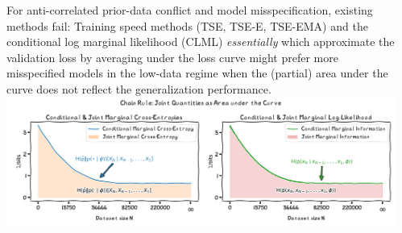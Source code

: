 \documentclass[25pt,a0paper,landscape]{tikzposter}
\begin{document}
\begin{columns}
{{\begin{theorybox}
        For anti-correlated prior-data conflict and model misspecification, existing methods fail:
        Training speed methods (TSE, TSE-E, TSE-EMA) \citep{lyle2020bayesian,ru2021speedy} and the conditional log marginal likelihood (CLML) \citep{fong2020marginal,lotfi2022bayesian} \emph{essentially} which approximate the validation loss by averaging under the loss curve might prefer more misspecified models in the low-data regime when the (partial) area under the curve does not reflect the generalization performance.
        \includegraphics[width=\linewidth]{area_under_curve_1.00.png}
      \end{theorybox}
    }
  }
  {
    {
      \small
      
      
    }
  }
  \begin{subcolumns}
  \end{subcolumns}
\end{columns}
\end{document}
